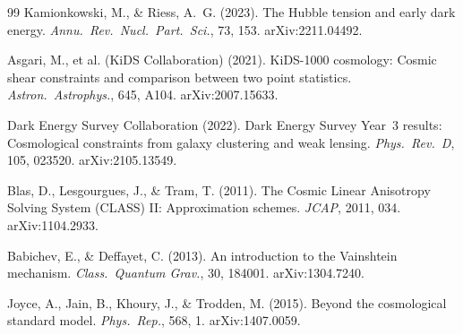 \documentclass[12pt,a4paper]{article}
\begin{document}
\begin{thebibliography}{99}
  Kamionkowski, M., \& Riess, A.~G. (2023).
  The Hubble tension and early dark energy.
  \textit{Annu.\ Rev.\ Nucl.\ Part.\ Sci.}, 73, 153.
  arXiv:2211.04492.

  Asgari, M., et al. (KiDS Collaboration) (2021).
  KiDS-1000 cosmology: Cosmic shear constraints and comparison between two
  point statistics.
  \textit{Astron.\ Astrophys.}, 645, A104.
  arXiv:2007.15633.

  Dark Energy Survey Collaboration (2022).
  Dark Energy Survey Year~3 results: Cosmological constraints from galaxy
  clustering and weak lensing.
  \textit{Phys.\ Rev.\ D}, 105, 023520.
  arXiv:2105.13549.

  Blas, D., Lesgourgues, J., \& Tram, T. (2011).
  The Cosmic Linear Anisotropy Solving System (CLASS) II: Approximation
  schemes.
  \textit{JCAP}, 2011, 034.
  arXiv:1104.2933.

  Babichev, E., \& Deffayet, C. (2013).
  An introduction to the Vainshtein mechanism.
  \textit{Class.\ Quantum Grav.}, 30, 184001.
  arXiv:1304.7240.

  Joyce, A., Jain, B., Khoury, J., \& Trodden, M. (2015).
  Beyond the cosmological standard model.
  \textit{Phys.\ Rep.}, 568, 1.
  arXiv:1407.0059.

\end{thebibliography}
\end{document}
